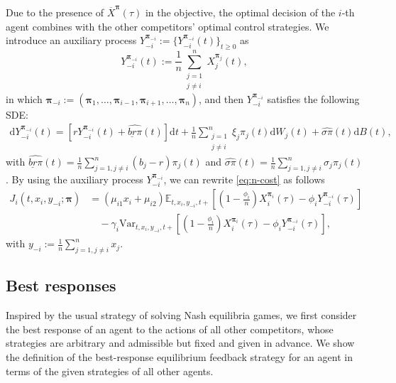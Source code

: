 \documentclass[11pt]{article}
\newcommand \drm {\mathrm{d}}
\numberwithin{equation}{section}
\newcommand{\bpi}{\boldsymbol{\pi}}
\providecommand{\smn}{{-}} %
\begin{document}
Due to the presence of $\overline{X}^{\bpi}(\tau)$ in the objective, the optimal decision of the $i$-th agent combines with the other competitors' optimal control strategies. We introduce an auxiliary process
$Y^{\bpi_{\smn i}}_{\smn i}:=\{Y^{\bpi_{\smn i}}_{\smn i}(t)\}_{t \ge 0}$ as
	\[Y^{\bpi_{\smn i}}_{\smn i}(t):=\frac{1}{n}\sum_{\substack{j = 1\\j\neq i}}^{n}X^{\bpi_j}_j(t),\]
in which
${\bpi_{{\smn i}}}:= (\boldsymbol{\pi}_1,\ldots, \boldsymbol{\pi}_{i-1}, \boldsymbol{\pi}_{i+1},\ldots, \boldsymbol{\pi}_n)$, and then $Y^{\bpi_{\smn i}}_{\smn i}$ satisfies the following SDE:
	\begin{align}\label{eq:Y}
		\drm Y^{\bpi_{\smn i}}_{\smn i}(t)
		=\left[r Y^{\bpi_{\smn i}}_{\smn i}(t)+\widehat{\underline{br}\pi}(t)\right]\drm t+\frac{1}{n}\sum_{\substack{j = 1\\j\neq i}}^{n}\xi_j\pi_j(t)\drm W_j(t)+\widehat{\sigma\pi}(t)\drm B(t),
	\end{align}
	with \(\widehat{\underline{br}\pi}(t)=\frac{1}{n}\sum_{j=1, j \neq i}^{n}(b_j - r)\pi_j(t)\) and \(\widehat{\sigma\pi}(t)=\frac{1}{n}\sum_{j=1, j \neq i}^{n}\sigma_j\pi_j(t)\). By using the auxiliary process $Y^{\bpi_{\smn i}}_{\smn i}$, we can rewrite \eqref{eq:n-cost} as follows
	\begin{align}
		J_i(t, x_i, y_{\smn i}; \bm{\pi}) &= (\mu_{i1} x_i + \mu_{i2}) \mathbb{E}_{t, x_i, y_{\smn i}, t+}\left[\left(1 - \frac{\phi_i}{n}\right) X^{\bpi_i}_i(\tau) - \phi_i Y^{\bpi_{\smn i}}_{\smn i}(\tau)\right] \\
		&\quad - \gamma_i \text{Var}_{t, x_i, y_{\smn i}, t+}\left[\left(1 - \frac{\phi_i}{n}\right) X^{\bpi_i}_i(\tau) - \phi_i Y^{\bpi_{\smn i}}_{\smn i}(\tau)\right], \label{eq:fun_Ji}
	\end{align}
	with \(y_{\smn i} := \frac{1}{n} \sum_{j=1, j \neq i}^{n} x_j\).

	\subsection{Best responses} \label{subsec:verif}


	Inspired by the usual strategy of solving Nash equilibria games, we first consider the best response of an agent to the actions of all other competitors, whose strategies are arbitrary and admissible but fixed and given in advance.
We show the definition of the best-response equilibrium feedback strategy for an agent in terms of the given strategies of all other agents.
	
\end{document}
